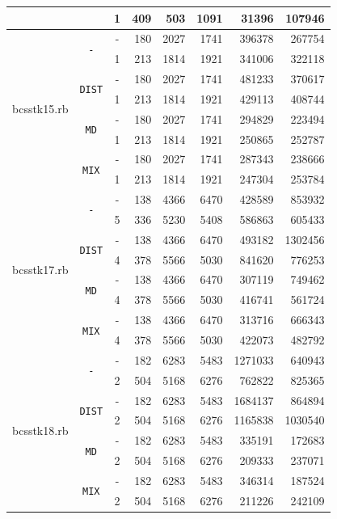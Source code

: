 \documentclass[11pt,american,czech,oneside]{book}
\theoremstyle{plain}
\theoremstyle{definition}
\begin{document}
{\begin{tabular}{|l|c|c|r|r|r|r|r|}
	& & 1 &	409	&	503	  &	1091 &	31396	&	107946	\\
\hline
\multirow{8}{*}{bcsstk15.rb}
	& \multirow{2}{*}{\texttt{-}}
  	& -	  & 180	& 2027  & 1741 & 396378	&	267754	\\
	& & 1 	&	213	&	1814	&	1921	&	341006	&	322118	\\
	& \multirow{2}{*}{\texttt{DIST}}
  	& -	  & 180	& 2027  & 1741 & 481233	&	370617	\\
	& & 1 	&	213	&	1814	&	1921	&	429113	&	408744	\\
	& \multirow{2}{*}{\texttt{MD}}
  	& -	  & 180	& 2027  & 1741 & 294829	&	223494	\\
	& & 1 	&	213	&	1814	&	1921	&	250865	&	252787	\\
	& \multirow{2}{*}{\texttt{MIX}}
  	& -	  & 180	& 2027  & 1741 & 287343	&	238666	\\
	& & 1 	&	213	&	1814	&	1921	&	247304	&	253784	\\
\hline
\multirow{8}{*}{bcsstk17.rb}
	& \multirow{2}{*}{\texttt{-}}
  	& -	& 138	& 4366  & 6470  &  428589	&	853932	\\
	& & 5	&	336	&	5230	&	5408	&	586863	&	605433	\\
	& \multirow{2}{*}{\texttt{DIST}}
  	& -	& 138	& 4366  & 6470  & 493182	&	1302456	\\
	& & 4	&	378	&	5566	&	5030	&	841620	&	776253	\\
	& \multirow{2}{*}{\texttt{MD}}
  	& -	& 138	& 4366  & 6470  & 307119	&	749462	\\
	& & 4	&	378	&	5566	&	5030	&	416741	&	561724	\\
	& \multirow{2}{*}{\texttt{MIX}}
  	& -	& 138	& 4366  & 6470  & 313716	&	666343	\\
	& & 4	&	378	&	5566	&	5030	&	422073	&	482792	\\
\hline
\multirow{8}{*}{bcsstk18.rb}
	& \multirow{2}{*}{\texttt{-}}
    & -	& 182	& 6283  & 5483  & 1271033	&	640943	\\
	& & 2	&	504	&	5168	&	6276	&	762822	&	825365	\\
	& \multirow{2}{*}{\texttt{DIST}}
  	& -	& 182	& 6283  & 5483  & 1684137	&	864894	\\
	& & 2	&	504	&	5168	&	6276	&	1165838	&	1030540	\\
	& \multirow{2}{*}{\texttt{MD}}
  	& -	& 182	& 6283  & 5483  & 335191	&	172683	\\
	& & 2	&	504	&	5168	&	6276	&	209333	&	237071	\\
	& \multirow{2}{*}{\texttt{MIX}}
  	& -	& 182	& 6283  & 5483  & 346314	&	187524	\\
	& & 2	&	504	&	5168	&	6276	&	211226	&	242109	\\
\hline
\end{tabular}
}
\bigskip
\end{document}
